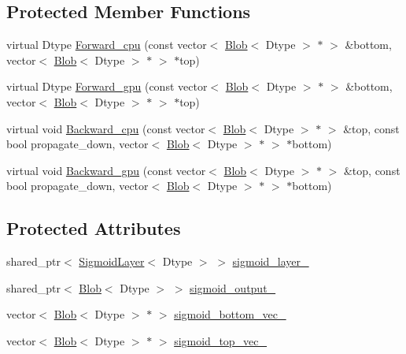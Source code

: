 \subsection*{Protected Member Functions}
\begin{DoxyCompactItemize}
\item 
virtual Dtype \hyperlink{classcaffe_1_1_sigmoid_cross_entropy_loss_layer_abfc9e224038c2052c3bbc4372914b3db}{Forward\+\_\+cpu} (const vector$<$ \hyperlink{classcaffe_1_1_blob}{Blob}$<$ Dtype $>$ $\ast$ $>$ \&bottom, vector$<$ \hyperlink{classcaffe_1_1_blob}{Blob}$<$ Dtype $>$ $\ast$ $>$ $\ast$top)
\item 
virtual Dtype \hyperlink{classcaffe_1_1_sigmoid_cross_entropy_loss_layer_a255cf432942a246a456bbc8e4d499436}{Forward\+\_\+gpu} (const vector$<$ \hyperlink{classcaffe_1_1_blob}{Blob}$<$ Dtype $>$ $\ast$ $>$ \&bottom, vector$<$ \hyperlink{classcaffe_1_1_blob}{Blob}$<$ Dtype $>$ $\ast$ $>$ $\ast$top)
\item 
virtual void \hyperlink{classcaffe_1_1_sigmoid_cross_entropy_loss_layer_a336c6f8453f30a598c280cc0259a5a95}{Backward\+\_\+cpu} (const vector$<$ \hyperlink{classcaffe_1_1_blob}{Blob}$<$ Dtype $>$ $\ast$ $>$ \&top, const bool propagate\+\_\+down, vector$<$ \hyperlink{classcaffe_1_1_blob}{Blob}$<$ Dtype $>$ $\ast$ $>$ $\ast$bottom)
\item 
virtual void \hyperlink{classcaffe_1_1_sigmoid_cross_entropy_loss_layer_a7065249b414fc6eac3dd19d7ba4100f6}{Backward\+\_\+gpu} (const vector$<$ \hyperlink{classcaffe_1_1_blob}{Blob}$<$ Dtype $>$ $\ast$ $>$ \&top, const bool propagate\+\_\+down, vector$<$ \hyperlink{classcaffe_1_1_blob}{Blob}$<$ Dtype $>$ $\ast$ $>$ $\ast$bottom)
\end{DoxyCompactItemize}
\subsection*{Protected Attributes}
\begin{DoxyCompactItemize}
\item 
shared\+\_\+ptr$<$ \hyperlink{classcaffe_1_1_sigmoid_layer}{Sigmoid\+Layer}$<$ Dtype $>$ $>$ \hyperlink{classcaffe_1_1_sigmoid_cross_entropy_loss_layer_a69e0c8d2106b4b06c7c896e3069f531c}{sigmoid\+\_\+layer\+\_\+}
\item 
shared\+\_\+ptr$<$ \hyperlink{classcaffe_1_1_blob}{Blob}$<$ Dtype $>$ $>$ \hyperlink{classcaffe_1_1_sigmoid_cross_entropy_loss_layer_a1eb4c2e90dd4807dbfb0806a411a7bea}{sigmoid\+\_\+output\+\_\+}
\item 
vector$<$ \hyperlink{classcaffe_1_1_blob}{Blob}$<$ Dtype $>$ $\ast$ $>$ \hyperlink{classcaffe_1_1_sigmoid_cross_entropy_loss_layer_a52c3183799d44aa9e581992aee502409}{sigmoid\+\_\+bottom\+\_\+vec\+\_\+}
\item 
vector$<$ \hyperlink{classcaffe_1_1_blob}{Blob}$<$ Dtype $>$ $\ast$ $>$ \hyperlink{classcaffe_1_1_sigmoid_cross_entropy_loss_layer_af6719c9685fcf910129db20cceb47be5}{sigmoid\+\_\+top\+\_\+vec\+\_\+}
\end{DoxyCompactItemize}


